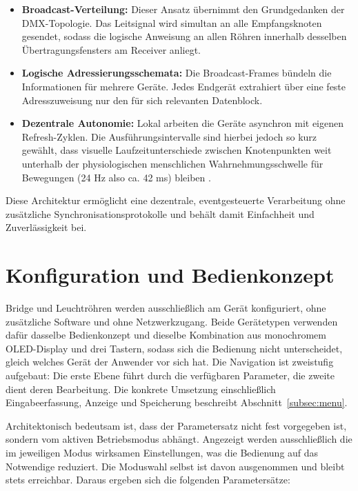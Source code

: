 \begin{itemize}
    \item \textbf{Broadcast-Verteilung:} Dieser Ansatz übernimmt den Grundgedanken der DMX-Topologie.
    Das Leitsignal wird simultan an alle Empfangsknoten gesendet, 
    sodass die logische Anweisung an allen Röhren innerhalb desselben Übertragungsfensters am Receiver anliegt.
    
    \item \textbf{Logische Adressierungsschemata:} Die Broadcast-Frames bündeln die Informationen für mehrere Geräte. 
    Jedes Endgerät extrahiert über eine feste Adresszuweisung nur den für sich relevanten Datenblock.
    
    \item \textbf{Dezentrale Autonomie:} Lokal arbeiten die Geräte asynchron mit eigenen Refresh-Zyklen. 
    Die Ausführungsintervalle sind hierbei jedoch so kurz gewählt, dass visuelle Laufzeitunterschiede 
    zwischen Knotenpunkten weit unterhalb der physiologischen menschlichen Wahrnehmungsschwelle für Bewegungen (24 Hz also ca. 42 ms) bleiben \cite{fujii2018,ramunae2025}.
\end{itemize}

Diese Architektur ermöglicht eine dezentrale, eventgesteuerte Verarbeitung ohne zusätzliche Synchronisationsprotokolle 
und behält damit Einfachheit und Zuverlässigkeit bei.

\section{Konfiguration und Bedienkonzept}
\label{sec:konfiguration-und-bedienkonzept}

Bridge und Leuchtröhren werden ausschließlich am Gerät konfiguriert, ohne zusätzliche
Software und ohne Netzwerkzugang. Beide Gerätetypen verwenden dafür dasselbe
Bedienkonzept und dieselbe Kombination aus monochromem OLED-Display und drei Tastern,
sodass sich die Bedienung nicht unterscheidet, gleich welches Gerät der Anwender vor sich
hat. Die Navigation ist zweistufig aufgebaut: Die erste Ebene führt durch die verfügbaren
Parameter, die zweite dient deren Bearbeitung. Die konkrete Umsetzung einschließlich
Eingabeerfassung, Anzeige und Speicherung beschreibt
Abschnitt~\ref{subsec:menu}.

Architektonisch bedeutsam ist, dass der Parametersatz nicht fest vorgegeben ist, sondern
vom aktiven Betriebsmodus abhängt. Angezeigt werden ausschließlich die im jeweiligen
Modus wirksamen Einstellungen, was die Bedienung auf das Notwendige reduziert. Die
Moduswahl selbst ist davon ausgenommen und bleibt stets erreichbar. Daraus ergeben sich
die folgenden Parametersätze:

